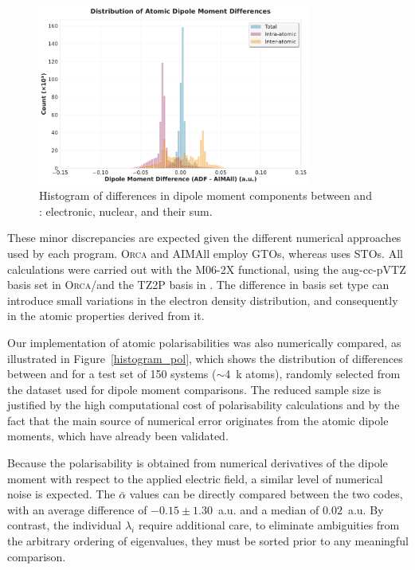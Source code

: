 \begin{figure}[h]
  \centering
  \includegraphics[width=0.8\textwidth]{img/histogram_dipole_total.pdf}
  \caption{Histogram of differences in dipole moment components between \adf and
    \aimall: electronic, nuclear, and their sum.}
  \label{histogram_dipole}
\end{figure}

These minor discrepancies are expected given the different numerical approaches
used by each program. \textsc{Orca} and AIMAll employ \glspl{GTO}, whereas
\adf uses \glspl{STO}. All calculations were carried out with the M06-2X
functional, using the aug-cc-pVTZ basis set in \textsc{Orca}/\aimall and the
TZ2P basis in \adf. The difference in basis set type can introduce small
variations in the electron density distribution, and consequently in the atomic
properties derived from it.

\newpage
Our implementation of atomic polarisabilities was also numerically compared, as
illustrated in Figure~\ref{histogram_pol}, which shows the distribution of
differences between \adf and \aimall for a test set of 150 systems ($\sim$4~k
atoms), randomly selected from the dataset used for dipole moment comparisons.
The reduced sample size is justified by the high computational cost of
polarisability calculations and by the fact that the main source of numerical
error originates from the atomic dipole moments, which have already been
validated. 

Because the polarisability is obtained from numerical derivatives of the dipole
moment with respect to the applied electric field, a similar level of numerical
noise is expected. The $\bar{\alpha}$ values can be directly compared between
the two codes, with an average difference of $-0.15 \pm 1.30$~a.u. and a median
of $0.02$~a.u. By contrast, the individual $\lambda_i$ require additional care,
to eliminate ambiguities from the arbitrary ordering of eigenvalues, they must
be sorted prior to any meaningful comparison.


